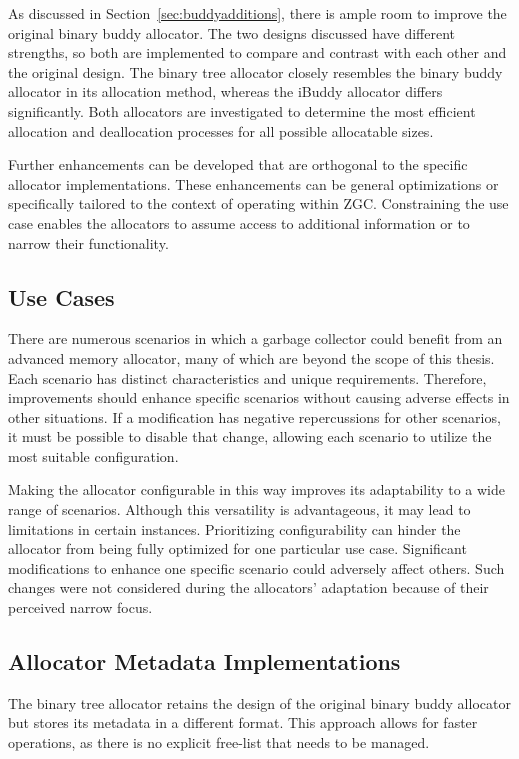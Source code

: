 As discussed in Section~\ref{sec:buddyadditions}, there is ample room to improve the original binary buddy allocator. The two designs discussed have different strengths, so both are implemented to compare and contrast with each other and the original design. The binary tree allocator closely resembles the binary buddy allocator in its allocation method, whereas the iBuddy allocator differs significantly. Both allocators are investigated to determine the most efficient allocation and deallocation processes for all possible allocatable sizes.

Further enhancements can be developed that are orthogonal to the specific allocator implementations. These enhancements can be general optimizations or specifically tailored to the context of operating within ZGC. Constraining the use case enables the allocators to assume access to additional information or to narrow their functionality.

\subsection{Use Cases}
There are numerous scenarios in which a garbage collector could benefit from an advanced memory allocator, many of which are beyond the scope of this thesis. Each scenario has distinct characteristics and unique requirements. Therefore, improvements should enhance specific scenarios without causing adverse effects in other situations. If a modification has negative repercussions for other scenarios, it must be possible to disable that change, allowing each scenario to utilize the most suitable configuration.

Making the allocator configurable in this way improves its adaptability to a wide range of scenarios. Although this versatility is advantageous, it may lead to limitations in certain instances. Prioritizing configurability can hinder the allocator from being fully optimized for one particular use case. Significant modifications to enhance one specific scenario could adversely affect others. Such changes were not considered during the allocators' adaptation because of their perceived narrow focus.

\subsection{Allocator Metadata Implementations} \label{sec:adaptationsmetadata}
The binary tree allocator retains the design of the original binary buddy allocator but stores its metadata in a different format. This approach allows for faster operations, as there is no explicit free-list that needs to be managed.

